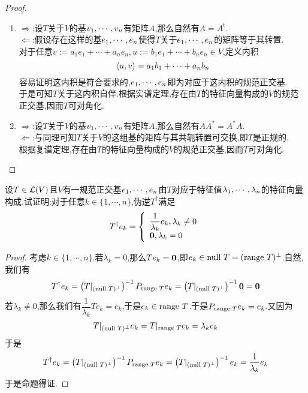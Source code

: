 \documentclass{ctexart}
\begin{document}
\begin{proof}
    \begin{enumerate}[label=\tbf{(\arabic*)}]
        \item $\Rightarrow$:设$T$关于$V$的基${v}_1,\cdots,{v}_{n}$有矩阵$A$,那么自然有$A=A^\text{t}$.\\
            $\Leftarrow$:假设存在这样的基${e}_1,\cdots,{e}_{n}$使得$T$关于${e}_1,\cdots,{e}_{n}$的矩阵等于其转置.\\
            对于任意$v:=a_1e_1+\cdots+a_ne_n,u:=b_1e_1+\cdots+b_ne_n\in V$,定义内积
            \[\left\langle{u},{v}\right\rangle=a_1b_1+\cdots+a_nb_n\]
            容易证明这内积是符合要求的,${e}_1,\cdots,{e}_{n}$即为对应于这内积的规范正交基.\\
            于是可知$T$关于这内积自伴.根据实谱定理,存在由$T$的特征向量构成的$V$的规范正交基,因而$T$可对角化.
        \item $\Rightarrow$:设$T$关于$V$的基${v}_1,\cdots,{v}_{n}$有矩阵$A$,那么自然有$AA^*=A^*A$.\\
            $\Leftarrow$:与同理可知$T$关于$V$的这组基的矩阵与其共轭转置可交换,即$T$是正规的.\\
            根据复谱定理,存在由$T$的特征向量构成的$V$的规范正交基,因而$T$可对角化.
    \end{enumerate}
\end{proof}
\begin{problem}[25.]
    设$T\in\mathcal{L}(V)$且$V$有一规范正交基${e}_1,\cdots,{e}_{n}$由$T$对应于特征值${\lambda}_1,\cdots,{\lambda}_{n}$的特征向量构成.试证明:对于任意$k\in\{1,\cdots,n\}$,伪逆$T^\dagger$满足
    \[T^\dagger e_k=\left\{\begin{array}{l}
        \dfrac{1}{\lambda_k}e_k,\lambda_k\neq0\\
        \mathbf0,\lambda_k=0
    \end{array}\right.\]
\end{problem}
\begin{proof}
    考虑$k\in\{1,\cdots,n\}$.若$\lambda_k=0$,那么$Te_k=\mathbf0$,即$e_k\in\text{null } T=(\text{range } T)^\bot$.自然,我们有
    \[T^\dagger e_k=\left(T|_{(\text{null } T)^\bot}\right)^{-1}P_{\text{range } T}e_k=\left(T|_{(\text{null } T)^\bot}\right)^{-1}\mathbf0=\mathbf0\]
    若$\lambda_k\neq0$,那么我们有$\dfrac{1}{\lambda_k}Te_k=e_k$,于是$e_k\in\text{range } T$.于是$P_{\text{range } T}e_k=e_k$.又因为
    \[T|_{(\text{null } T)^\bot}e_k=T|_{\text{range } T}e_k=\lambda_ke_k\]
    于是
    \[T^\dagger e_k=\left(T|_{(\text{null } T)^\bot}\right)^{-1}P_{\text{range } T}e_k=\left(T|_{(\text{null } T)^\bot}\right)^{-1}e_k=\dfrac{1}{\lambda_k}e_k\]
    于是命题得证.
\end{proof}
\end{document}
